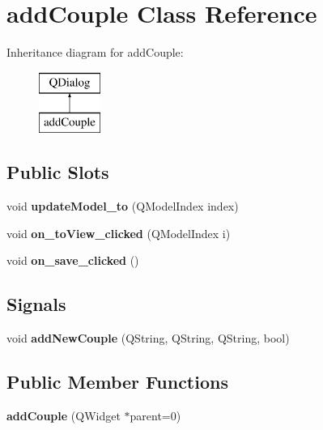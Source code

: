 \hypertarget{classadd_couple}{}\section{add\+Couple Class Reference}
\label{classadd_couple}
Inheritance diagram for add\+Couple\+:\begin{figure}[H]
\begin{center}
\leavevmode
\includegraphics[height=2.000000cm]{classadd_couple}
\end{center}
\end{figure}
\subsection*{Public Slots}
\begin{DoxyCompactItemize}
\item 
\mbox{\label{classadd_couple_aa0334cda3e89d32093da234cbd1e8c07}} 
void {\bfseries update\+Model\+\_\+to} (Q\+Model\+Index index)
\item 
\mbox{\label{classadd_couple_af8d724cab931e45a5e68a341fd831aca}} 
void {\bfseries on\+\_\+to\+View\+\_\+clicked} (Q\+Model\+Index i)
\item 
\mbox{\label{classadd_couple_ad3a6409a37b17097325d0b65ee1ab15b}} 
void {\bfseries on\+\_\+save\+\_\+clicked} ()
\end{DoxyCompactItemize}
\subsection*{Signals}
\begin{DoxyCompactItemize}
\item 
\mbox{\label{classadd_couple_a2c807c5516dfa2ff6ecd00622914eb4c}} 
void {\bfseries add\+New\+Couple} (Q\+String, Q\+String, Q\+String, bool)
\end{DoxyCompactItemize}
\subsection*{Public Member Functions}
\begin{DoxyCompactItemize}
\item 
\mbox{\label{classadd_couple_a5c478c6e07cd0b9639c4c84687c89764}} 
{\bfseries add\+Couple} (Q\+Widget $\ast$parent=0)
\end{DoxyCompactItemize}


